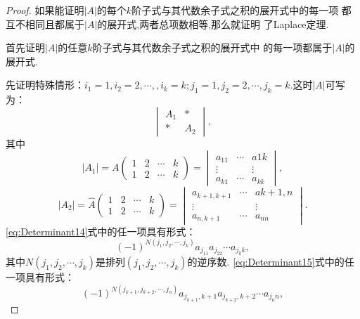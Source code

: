 \begin{proof}
  如果能证明$|A|$的每个$k$阶子式与其代数余子式之积的展开式中的每一项
  都互不相同且都属于$|A|$的展开式,两者总项数相等,那么就证明
  了Laplace定理.

  首先证明$|A|$的任意$k$阶子式与其代数余子式之积的展开式中
  的每一项都属于$|A|$的展开式.

  先证明特殊情形：$i_1=1,i_2=2,\cdots,
  ,i_k=k;j_1=1,j_2=2,\cdots,j_k=k$.这时$|A|$可写为：
  \begin{equation}
    \label{eq:Determinant13}
    \begin{vmatrix}
      A_1 & *\\
      * & A_2
    \end{vmatrix},
  \end{equation}
  其中
  \begin{equation}
    \label{eq:Determinant14}
    |A_1|=A
    \left(\begin{smallmatrix}
      1 & 2 & \cdots & k\\
      1 & 2 & \cdots & k
    \end{smallmatrix}\right)=
    \begin{vmatrix}
      a_{11}& \cdots & a{1k}\\
      \vdots & & \vdots\\
      a_{k1}& \cdots & a_{kk}
    \end{vmatrix},
  \end{equation}
  \begin{equation}
    \label{eq:Determinant15}
    |A_2|=\widehat{A}
    \left(\begin{smallmatrix}
      1 & 2 & \cdots & k\\
      1 & 2 & \cdots & k
    \end{smallmatrix}\right)=
    \begin{vmatrix}
      a_{k+1,k+1}& \cdots & a{k+1,n}\\
      \vdots & & \vdots\\
      a_{n,k+1}& \cdots & a_{nn}
    \end{vmatrix}.
  \end{equation}
  \eqref{eq:Determinant14}式中的任一项具有形式：
  \begin{equation*}
    (-1)^{N(j_1,j_2,\cdots,j_k)}a_{j_11}a_{j_22}\cdots a_{j_kk},
  \end{equation*}
  其中$N(j_1,j_2,\cdots,j_k)$是排列$(j_1,j_2,\cdots,j_k)$的逆序数.
  \eqref{eq:Determinant15}式中的任一项具有形式：
  \begin{equation*}
    (-1)^{N(j_{k+1},j_{k+2},\cdots,j_n)}a_{j_{k+1},k+1}a_{j_{k+2},k+2}\cdots a_{j_nn},

\end{equation*}
\end{proof}
